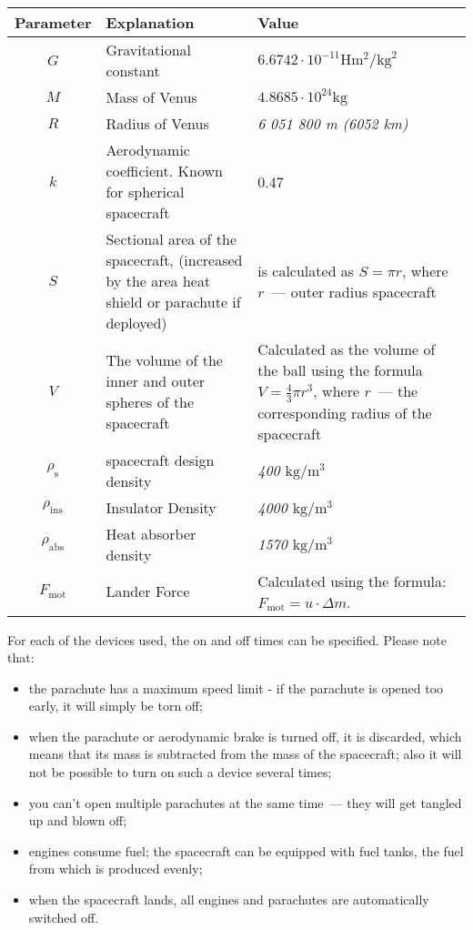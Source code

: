 \documentclass[12pt,a4paper]{article}
\begin{document}
\begin{center}
\begin{tabular}{ |c|p{6.5cm}|p{6cm}| }
  \hline
  \textbf{Parameter} & \textbf{Explanation} & \textbf{Value} \\
   \hline
   $ G $ & Gravitational constant & $ 6.6742 \cdot 10^{-11} \text{H} \text{m}^{2}/\text{kg}^{2} $ \\
   \hline
   $ M $ & Mass of Venus & $4.8685 \cdot 10^{24} \text{kg}$ \\
   \hline
   $ R $ & Radius of Venus & \emph{6 051 800 m (6052 km)} \\
   \hline
   $ k $ & Aerodynamic coefficient. Known for spherical spacecraft & 0.47 \\
   \hline
   $ S $ & Sectional area of the spacecraft, (increased by the area
   heat shield or parachute if deployed) & is calculated as $ S = \pi r $,
   where $r$~--- outer radius
   spacecraft \\
   \hline
   $ V $ & The volume of the inner and outer spheres of the spacecraft & Calculated as the volume of the ball using the formula $V = \frac{4}{3} \pi
     r^3$, where $r$~--- the corresponding radius of the spacecraft\\
   \hline
   $ \rho_{\text{s}} $ & spacecraft design density & \emph{400 $\text{kg}/\text{m}^3$} \\
   \hline
   $ \rho_{\text{ins}} $ & Insulator Density & \emph{4000 $\text{kg}/\text{m}^3$} \\
   \hline
   $ \rho_{\text{abs}} $ & Heat absorber density & \emph{1570 $\text{kg}/\text{m}^3$} \\
   \hline
   $ F_{\text{mot}} $ & Lander Force &
   Calculated using the formula: $ F_{\text{mot}} = u \cdot \Delta m$.\\
   \hline
\end{tabular}
\end{center}

For each of the devices used, the on and off times can be specified. Please note that:

\begin{itemize}
   \item the parachute has a maximum speed limit - if the parachute is opened too early, it will simply be torn off;
   \item when the parachute or aerodynamic brake is turned off, it is discarded, which means that its mass is subtracted from the mass of the spacecraft; also it will not be possible to turn on such a device several times;
   \item you can't open multiple parachutes at the same time~--- they will get tangled up and blown off;
   \item engines consume fuel; the spacecraft can be equipped with fuel tanks, the fuel from which is produced evenly;
   \item when the spacecraft lands, all engines and parachutes are automatically switched off.
\end{itemize}
\end{document}
